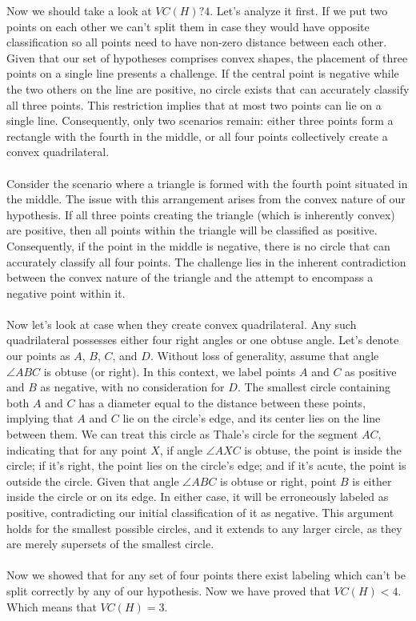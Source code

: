 \documentclass[a4paper]{article}
\begin{document}
	Now we should take a look at $VC(H) ? 4$. Let's analyze it first. If we put two points on each other we can't split them in case they would have opposite classification so all points need to have non-zero distance between each other. Given that our set of hypotheses comprises convex shapes, the placement of three points on a single line presents a challenge. If the central point is negative while the two others on the line are positive, no circle exists that can accurately classify all three points. This restriction implies that at most two points can lie on a single line. Consequently, only two scenarios remain: either three points form a rectangle with the fourth in the middle, or all four points collectively create a convex quadrilateral.
	\\
	\\
	Consider the scenario where a triangle is formed with the fourth point situated in the middle. The issue with this arrangement arises from the convex nature of our hypothesis. If all three points creating the triangle (which is inherently convex) are positive, then all points within the triangle will be classified as positive. Consequently, if the point in the middle is negative, there is no circle that can accurately classify all four points. The challenge lies in the inherent contradiction between the convex nature of the triangle and the attempt to encompass a negative point within it.
	\\
	\\
	Now let's look at case when they create convex quadrilateral.  Any such quadrilateral possesses either four right angles or one obtuse angle. Let's denote our points as $A$, $B$, $C$, and $D$. Without loss of generality, assume that angle $\angle ABC$ is obtuse (or right). In this context, we label points $A$ and $C$ as positive and $B$ as negative, with no consideration for $D$. The smallest circle containing both $A$ and $C$ has a diameter equal to the distance between these points, implying that $A$ and $C$ lie on the circle's edge, and its center lies on the line between them. We can treat this circle as Thale's circle for the segment $AC$, indicating that for any point $X$, if angle $\angle AXC$ is obtuse, the point is inside the circle; if it's right, the point lies on the circle's edge; and if it's acute, the point is outside the circle. Given that angle $\angle ABC$ is obtuse or right, point $B$ is either inside the circle or on its edge. In either case, it will be erroneously labeled as positive, contradicting our initial classification of it as negative. This argument holds for the smallest possible circles, and it extends to any larger circle, as they are merely supersets of the smallest circle.
	\\
	\\
	Now we showed that for any set of four points there exist labeling which can't be split correctly by any of our hypothesis. Now we have proved that $VC(H) < 4$. Which means that  $VC(H) = 3$.
\end{document}
